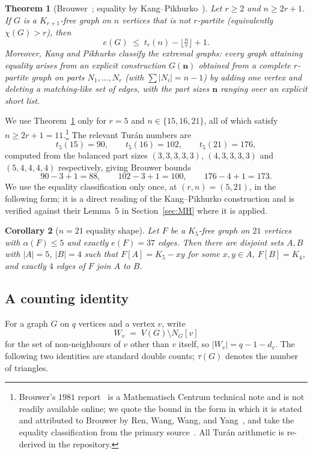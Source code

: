\documentclass[11pt,reqno]{amsart}
\newtheorem{theorem}{Theorem}[section]
\newtheorem{corollary}[theorem]{Corollary}
\theoremstyle{definition}
\theoremstyle{remark}
\newcommand{\abs}[1]{\left|#1\right|}
\begin{document}
\begin{theorem}[Brouwer~\cite{Brouwer81}; equality by Kang--Pikhurko~\cite{KP05}]
\label{thm:brouwer}
Let $r\ge 2$ and $n\ge 2r+1$. If $G$ is a $K_{r+1}$-free graph on $n$ vertices
that is not $r$-partite (equivalently $\chi(G)>r$), then
\[
  e(G)\;\le\; t_r(n)-\Big\lfloor\tfrac nr\Big\rfloor+1 .
\]
Moreover, Kang and Pikhurko classify the extremal graphs: every graph attaining
equality arises from an explicit construction $G(\mathbf n)$ obtained from a
complete $r$-partite graph on parts $N_1,\dots,N_r$ (with $\sum\abs{N_i}=n-1$) by
adding one vertex and deleting a matching-like set of edges, with the part sizes
$\mathbf n$ ranging over an explicit short list.
\end{theorem}

We use Theorem~\ref{thm:brouwer} only for $r=5$ and $n\in\{15,16,21\}$, all of which
satisfy $n\ge 2r+1=11$.\footnote{Brouwer's $1981$ report~\cite{Brouwer81} is a
Mathematisch Centrum technical note and is not readily available online; we quote
the bound in the form in which it is stated and attributed to Brouwer by Ren, Wang,
Wang, and Yang~\cite{RWWY}, and take the equality classification from the primary
source~\cite{KP05}. All Tur\'an arithmetic is re-derived in the repository.} The
relevant Tur\'an numbers are
\[
  t_5(15)=90,\qquad t_5(16)=102,\qquad t_5(21)=176,
\]
computed from the balanced part sizes $(3,3,3,3,3)$, $(4,3,3,3,3)$ and
$(5,4,4,4,4)$ respectively, giving Brouwer bounds
\begin{equation}\label{eq:brouwer-values}
  90-3+1=88,\qquad 102-3+1=100,\qquad 176-4+1=173.
\end{equation}
We use the equality classification only once, at $(r,n)=(5,21)$, in the following
form; it is a direct reading of the Kang--Pikhurko construction and is verified
against their Lemma~5 in Section~\ref{sec:MH} where it is applied.

\begin{corollary}[$n=21$ equality shape]\label{cor:equality21}
Let $F$ be a $K_5$-free graph on $21$ vertices with $\alpha(F)\le 5$ and exactly
$e(F)=37$ edges. Then there are disjoint sets $A,B$ with $\abs A=5$, $\abs B=4$
such that $F[A]=K_5-xy$ for some $x,y\in A$, $F[B]=K_4$, and exactly $4$ edges of
$F$ join $A$ to $B$.
\end{corollary}

\subsection{A counting identity}
For a graph $G$ on $q$ vertices and a vertex $v$, write
\[
  W_v \;=\; V(G)\setminus N_G[v]
\]
for the set of non-neighbours of $v$ other than $v$ itself, so $\abs{W_v}=q-1-d_v$.
The following two identities are standard double counts; $\tau(G)$ denotes the
number of triangles.
\end{document}
